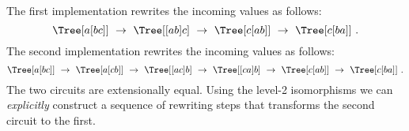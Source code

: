 \begin{code}%
\>[0]\AgdaSpace{}%
\AgdaSpace{}%
\AgdaSymbol{:}\AgdaSpace{}%
\AgdaSymbol{\{}\AgdaSpace{}%
\AgdaSpace{}%
\AgdaSpace{}%
\AgdaSymbol{:}\AgdaSpace{}%
\AgdaSymbol{\}}\AgdaSpace{}%
\AgdaSpace{}%
\AgdaSpace{}%
\AgdaSpace{}%
\AgdaSymbol{(}\AgdaSpace{}%
\AgdaSpace{}%
\AgdaSymbol{)}\AgdaSpace{}%
\AgdaSpace{}%
\AgdaSpace{}%
\AgdaSpace{}%
\AgdaSymbol{(}\AgdaSpace{}%
\AgdaSpace{}%
\AgdaSymbol{)}\<%
\\
\>[0]\AgdaSpace{}%
\AgdaSymbol{=}\AgdaSpace{}%
\AgdaSpace{}%
\AgdaSpace{}%
\AgdaSpace{}%
\AgdaSpace{}%
\AgdaSymbol{(}\AgdaSpace{}%
\AgdaSpace{}%
\AgdaSymbol{)}\<%
\\
%
\\[\AgdaEmptyExtraSkip]%
\>[0]\AgdaSpace{}%
\AgdaSymbol{=}%
\>[52I]\AgdaSymbol{(}\AgdaSpace{}%
\AgdaSpace{}%
\AgdaSymbol{)}\AgdaSpace{}%
\<%
\\
\>[.]\<[52I]%
\>[11]\AgdaSpace{}%
\<%
\\
%
\>[11]\AgdaSymbol{(}\AgdaSpace{}%
\AgdaSpace{}%
\AgdaSymbol{)}\AgdaSpace{}%
\<%
\\
%
\>[11]\AgdaSpace{}%
\<%
\\
%
\>[11]\AgdaSymbol{(}\AgdaSpace{}%
\AgdaSpace{}%
\AgdaSymbol{)}\<%
\end{code}

\noindent The first implementation rewrites the incoming values as follows:
\[
\Tree [ {\small a} [ {\small b} {\small c} ] ] ~\to~
\Tree [ [ {\small a} {\small b} ] {\small c} ] ~\to~
\Tree [ {\small c} [ {\small a} {\small b} ] ] ~\to~
\Tree [ {\small c} [ {\small b} {\small a} ] ] ~.
\]
\noindent
The second implementation rewrites the incoming values as follows:
\[
\Tree [ {\small a} [ {\small b} {\small c} ] ] ~\to~
\Tree [ {\small a} [ {\small c} {\small b} ] ] ~\to~
\Tree [ [ {\small a} {\small c} ] {\small b} ] ~\to~
\Tree [ [ {\small c} {\small a} ] {\small b} ] ~\to~
\Tree [ {\small c} [ {\small a} {\small b} ] ] ~\to~
\Tree [ {\small c} [ {\small b} {\small a} ] ] ~.
\]
\noindent The two circuits are extensionally equal. Using the level-2
isomorphisms we can \emph{explicitly} construct a sequence of
rewriting steps that transforms the second circuit to the first.

